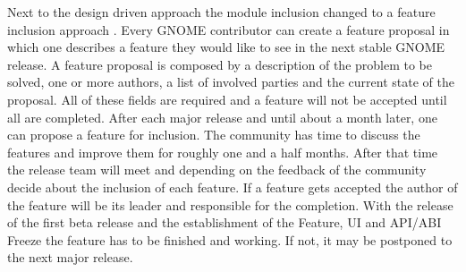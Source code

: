 Next to the design driven approach the module inclusion changed to a feature
inclusion approach \cite{GNOMEFeatures3.4,GNOMERoadMap}. Every GNOME
contributor can create a feature proposal in which one describes a feature they
would like to see in the next stable GNOME release. A feature proposal is
composed by a description of the problem to be solved, one or more authors, a
list of involved parties and the current state of the proposal. All of these
fields are required and a feature will not be accepted until all are completed.
After each major release and until about a month later, one can propose a
feature for inclusion. The community has time to discuss the features and
improve them for roughly one and a half months. After that time the release
team will meet and depending on the feedback of the community decide about the
inclusion of each feature. If a feature gets accepted the author of the feature
will be its leader and responsible for the completion. With the release of the
first beta release and the establishment of the Feature, \ac{UI} and
\ac{API}/\acs{ABI} Freeze the feature has to be finished and working. If not,
it may be postponed to the next major release.


